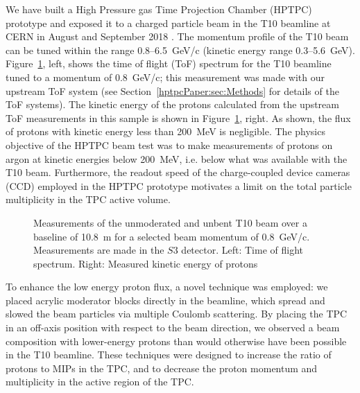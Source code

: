 We have built a High Pressure gas Time Projection Chamber (HPTPC) prototype and exposed it to a charged particle beam in the T10 beamline at CERN in August and September 2018 \cite{SPSC-P-355}.
The momentum profile of the T10 beam can be tuned within the range 0.8--6.5~GeV/c (kinetic energy range 0.3--5.6~GeV). 
Figure~\ref{fig:utofNoBend}, left, shows the time of flight (ToF) spectrum for the T10 beamline tuned to a momentum of 0.8~GeV/c; this measurement was made with our upstream ToF system (see Section~\ref{hptpcPaper:sec:Methods} for details of the ToF systems).
The kinetic energy of the protons calculated from the upstream ToF measurements in this sample is shown in Figure~\ref{fig:utofNoBend}, right.
As shown, the flux of protons with kinetic energy less than 200~MeV is negligible.
The physics objective of the HPTPC beam test was to make measurements of protons on argon at kinetic energies below 200~MeV, i.e. below what was available with the T10 beam. 
Furthermore, the readout speed of the charge-coupled device cameras (CCD) employed in the HPTPC prototype motivates a limit on the total particle multiplicity in the TPC active volume.

\begin{figure}
  \begin{minipage}[t]{0.49\textwidth}
    \centering
    \begin{adjustbox}{max totalsize={\textwidth},center}
      
    \end{adjustbox}
  \end{minipage}
  \hfill
  \begin{minipage}[t]{0.49\textwidth}
    \centering
    \begin{adjustbox}{max totalsize={\textwidth},center}
      
    \end{adjustbox}
  \end{minipage}
  \caption{\label{fig:utofNoBend}Measurements of the unmoderated and unbent T10 beam over a baseline of 10.8~m for a selected beam momentum of 0.8~GeV/c. Measurements are made in the $\mathit{S3}$ detector. Left: Time of flight spectrum. Right: Measured kinetic energy of protons}
\end{figure}

To enhance the low energy proton flux, a novel technique was employed:
we placed acrylic moderator blocks directly in the beamline, which spread and slowed the beam particles via multiple Coulomb scattering.
By placing the TPC in an off-axis position with respect to the beam direction, we observed a beam composition with lower-energy protons than would otherwise have been possible in the T10 beamline.
These techniques were designed to increase the ratio of protons to MIPs in the TPC, and to decrease the proton momentum and multiplicity in the active region of the TPC.

